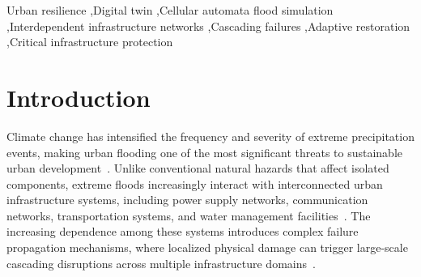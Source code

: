 \documentclass[preprint,12pt]{elsarticle}
\begin{document}
\begin{frontmatter}
\begin{abstract}
A case study of Miyazaki City, Japan, is conducted to evaluate the proposed
framework under an extreme typhoon rainfall scenario with a peak intensity of
100~mm/h. The results demonstrate that the framework can effectively
reproduce nonlinear flood propagation driven by heterogeneous terrain and
drainage saturation, identify spatial distributions of infrastructure
exposure, and reveal delayed cascading failure mechanisms caused by
infrastructure interdependencies and backup-energy depletion. Compared with
conventional fixed-priority restoration strategies and non-intervention
scenarios, the proposed adaptive restoration approach improves recovery
efficiency by dynamically allocating limited repair resources according to
system conditions and infrastructure criticality. Sensitivity analyses
further highlight the significant effects of rainfall intensity, drainage
capacity, backup-battery duration, and repair-resource availability on urban
resilience performance.

This study contributes a comprehensive and computationally reproducible
digital twin framework that bridges physical flood modeling, infrastructure
resilience analysis, and intelligent recovery decision-making. The proposed
approach provides a practical foundation for next-generation urban resilience
planning, emergency management, and climate adaptation under increasing flood
risks.
\end{abstract}

\begin{keyword}
Urban resilience \sep Digital twin \sep Cellular automata flood simulation
\sep Interdependent infrastructure networks \sep Cascading failures
\sep Adaptive restoration \sep Critical infrastructure protection
\end{keyword}

\end{frontmatter}

\section{Introduction}\label{sec:intro}

Climate change has intensified the frequency and severity of extreme
precipitation events, making urban flooding one of the most significant
threats to sustainable urban development~\cite{ipcc2012srex}. Unlike
conventional natural hazards that affect isolated components, extreme floods
increasingly interact with interconnected urban infrastructure systems,
including power supply networks, communication networks, transportation
systems, and water management facilities~\cite{rinaldi2001identifying}. The
increasing dependence among these systems introduces complex failure
propagation mechanisms, where localized physical damage can trigger
large-scale cascading disruptions across multiple infrastructure
domains~\cite{buldyrev2010catastrophic,gao2011robustness}.
\end{document}
